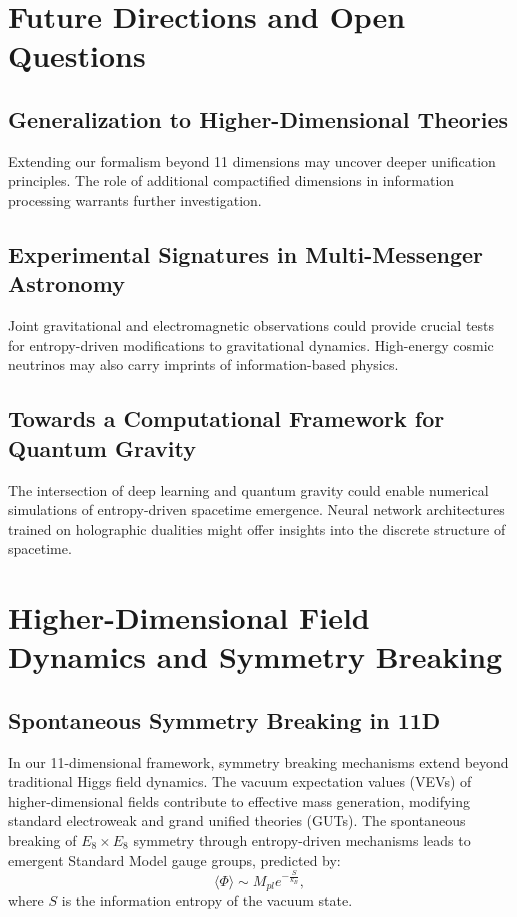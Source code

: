\documentclass{article}
\begin{document}
\section{Future Directions and Open Questions}

\subsection{Generalization to Higher-Dimensional Theories}
Extending our formalism beyond 11 dimensions may uncover deeper unification principles. The role of additional compactified dimensions in information processing warrants further investigation.

\subsection{Experimental Signatures in Multi-Messenger Astronomy}
Joint gravitational and electromagnetic observations could provide crucial tests for entropy-driven modifications to gravitational dynamics. High-energy cosmic neutrinos may also carry imprints of information-based physics.

\subsection{Towards a Computational Framework for Quantum Gravity}
The intersection of deep learning and quantum gravity could enable numerical simulations of entropy-driven spacetime emergence. Neural network architectures trained on holographic dualities might offer insights into the discrete structure of spacetime.

\section{Higher-Dimensional Field Dynamics and Symmetry Breaking}

\subsection{Spontaneous Symmetry Breaking in 11D}
In our 11-dimensional framework, symmetry breaking mechanisms extend beyond traditional Higgs field dynamics. The vacuum expectation values (VEVs) of higher-dimensional fields contribute to effective mass generation, modifying standard electroweak and grand unified theories (GUTs). The spontaneous breaking of $E_8 \times E_8$ symmetry through entropy-driven mechanisms leads to emergent Standard Model gauge groups, predicted by:
\begin{equation}
\langle \Phi \rangle \sim M_{pl} e^{-\frac{S}{k_B}},
\end{equation}
where $S$ is the information entropy of the vacuum state.
\end{document}
